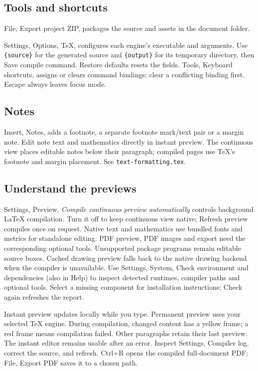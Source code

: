 \documentclass[11pt]{article}
\begin{document}
\subsection{Tools and shortcuts}
File, Export project ZIP, packages the source and assets in the document folder.

Settings, Options, \TeX{}, configures each engine's executable and arguments.
Use \texttt{\{source\}} for the generated source and \texttt{\{output\}} for
its temporary directory, then Save compile command. Restore defaults resets
the fields. Tools, Keyboard shortcuts, assigns or clears command bindings;
clear a conflicting binding first. Escape always leaves focus mode.

\subsection{Notes}
Insert, Notes, adds a footnote, a separate footnote mark/text pair or a margin
note. Edit note text and mathematics directly in instant preview. The continuous
view places editable notes below their paragraph; compiled pages use \TeX{}'s
footnote and margin placement. See \texttt{text-formatting.tex}.

\subsection{Understand the previews}
Settings, Preview, \emph{Compile continuous preview automatically} controls
background \LaTeX{} compilation. Turn it off to keep continuous view native;
Refresh preview compiles once on request. Native text and mathematics use bundled
fonts and metrics for standalone editing. PDF preview,
PDF images and export need the corresponding optional tools. Unsupported package
programs remain editable source boxes. Cached drawing preview falls back to the
native drawing backend when the compiler is unavailable.
Use Settings, System, Check environment and dependencies (also in Help) to
inspect detected runtimes, compiler paths and optional tools. Select a missing
component for installation instructions; Check again refreshes the report.

Instant preview updates locally while you type. Permanent preview uses your
selected \TeX{} engine. During compilation, changed content has a yellow frame;
a red frame means compilation failed. Other paragraphs retain their last preview.
The instant editor remains usable after an error. Inspect Settings, Compiler log,
correct the source, and refresh. Ctrl+R opens the compiled full-document PDF;
File, Export PDF saves it to a chosen path.
\end{document}
